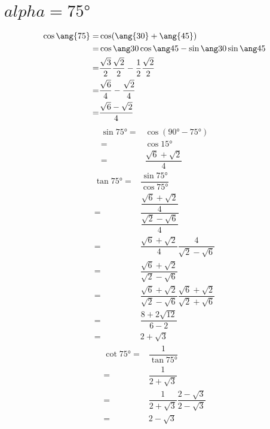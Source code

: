 \section{$alpha=\ang{75}$}
\begin{align*}
\cos\ang{75}=&\cos(\ang{30}+\ang{45})\\
=&\sumcos{30}{45}\\
=&\costrenta\cosquarantacinque-\sintrenta\sinquarantecinque\\
=&\dfrac{\sqrt{6}}{4}-\dfrac{\sqrt{2}}{4}\\
=&\dfrac{\sqrt{6}-\sqrt{2}}{4}
\end{align*}
\begin{align*}
\sin\ang{75}=&\cos(\ang{90}-\ang{75})\\
=&\cos\ang{15}\\
=&\dfrac{\sqrt{6}+\sqrt{2}}{4}
\end{align*}
\begin{align*}
\tan\ang{75}=&\dfrac{\sin\ang{75}}{\cos\ang{75}}\\
=&\dfrac{\dfrac{\sqrt{6}+\sqrt{2}}{4}}{\dfrac{\sqrt{2}-\sqrt{6}}{4}}\\
=&\dfrac{\sqrt{6}+\sqrt{2}}{4}\dfrac{4}{\sqrt{2}-\sqrt{6}}\\
=&\dfrac{\sqrt{6}+\sqrt{2}}{\sqrt{2}-\sqrt{6}}\\
=&\dfrac{\sqrt{6}+\sqrt{2}}{\sqrt{2}-\sqrt{6}}\dfrac{\sqrt{6}+\sqrt{2}}{\sqrt{2}+\sqrt{6}}\\
=&\dfrac{8+2\sqrt{12}}{6-2}\\
=&2+\sqrt{3}
\end{align*}
\begin{align*}
\cot\ang{75}=&\dfrac{1}{\tan\ang{75}}\\
=&\dfrac{1}{2+\sqrt{3}}\\
=&\dfrac{1}{2+\sqrt{3}}\dfrac{2-\sqrt{3}}{2-\sqrt{3}}\\
=&2-\sqrt{3}\\
\end{align*}
